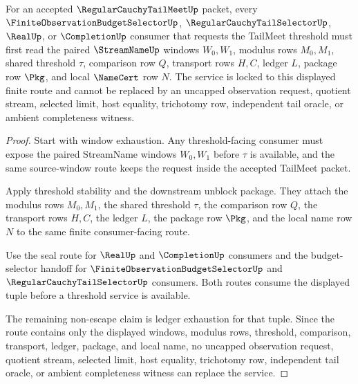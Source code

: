 \begin{theorem}
\label{thm:regular-cauchy-tail-meet-budget-window-service-lock}
For an accepted $\RegularCauchyTailMeetUp$ packet, every
$\FiniteObservationBudgetSelectorUp$, $\RegularCauchyTailSelectorUp$,
$\RealUp$, or $\CompletionUp$ consumer that requests the TailMeet threshold must
first read the paired $\StreamNameUp$ windows $W_0,W_1$, modulus rows
$M_0,M_1$, shared threshold $\tau$, comparison row $Q$, transport rows $H,C$,
ledger $L$, package row $\Pkg$, and local $\NameCert$ row $N$. The service is
locked to this displayed finite route and cannot be replaced by an uncapped
observation request, quotient stream, selected limit, host equality, trichotomy
row, independent tail oracle, or ambient completeness witness.
\end{theorem}
\begin{proof}
Start with window exhaustion. Any threshold-facing consumer must expose the
paired StreamName windows $W_0,W_1$ before $\tau$ is available, and the same
source-window route keeps the request inside the accepted TailMeet packet.

Apply threshold stability and the downstream unblock package. They attach the
modulus rows $M_0,M_1$, the shared threshold $\tau$, the comparison row $Q$, the
transport rows $H,C$, the ledger $L$, the package row $\Pkg$, and the local
name row $N$ to the same finite consumer-facing route.

Use the seal route for $\RealUp$ and $\CompletionUp$ consumers and the
budget-selector handoff for $\FiniteObservationBudgetSelectorUp$ and
$\RegularCauchyTailSelectorUp$ consumers. Both routes consume the displayed
tuple before a threshold service is available.

The remaining non-escape claim is ledger exhaustion for that tuple. Since the
route contains only the displayed windows, modulus rows, threshold, comparison,
transport, ledger, package, and local name, no uncapped observation request,
quotient stream, selected limit, host equality, trichotomy row, independent tail
oracle, or ambient completeness witness can replace the service.
\end{proof}

